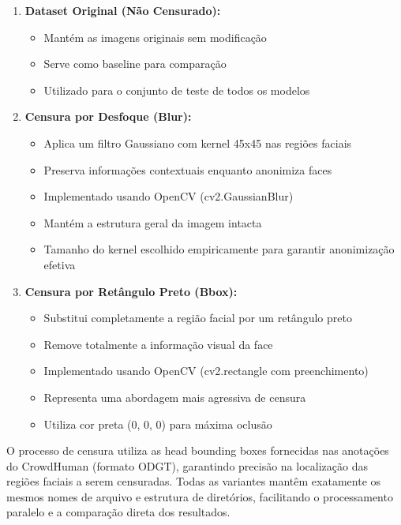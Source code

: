 \documentclass[12pt,a4paper]{article}
\begin{document}
\begin{enumerate}
    \item \textbf{Dataset Original (Não Censurado):}
    \begin{itemize}
        \item Mantém as imagens originais sem modificação
        \item Serve como baseline para comparação
        \item Utilizado para o conjunto de teste de todos os modelos
    \end{itemize}
    
    \item \textbf{Censura por Desfoque (Blur):}
    \begin{itemize}
        \item Aplica um filtro Gaussiano com kernel 45x45 nas regiões faciais
        \item Preserva informações contextuais enquanto anonimiza faces
        \item Implementado usando OpenCV (cv2.GaussianBlur)
        \item Mantém a estrutura geral da imagem intacta
        \item Tamanho do kernel escolhido empiricamente para garantir anonimização efetiva
    \end{itemize}
    
    \item \textbf{Censura por Retângulo Preto (Bbox):}
    \begin{itemize}
        \item Substitui completamente a região facial por um retângulo preto
        \item Remove totalmente a informação visual da face
        \item Implementado usando OpenCV (cv2.rectangle com preenchimento)
        \item Representa uma abordagem mais agressiva de censura
        \item Utiliza cor preta (0, 0, 0) para máxima oclusão
    \end{itemize}
\end{enumerate}

O processo de censura utiliza as head bounding boxes fornecidas nas anotações do CrowdHuman (formato ODGT), garantindo precisão na localização das regiões faciais a serem censuradas. Todas as variantes mantêm exatamente os mesmos nomes de arquivo e estrutura de diretórios, facilitando o processamento paralelo e a comparação direta dos resultados.
\end{document}

